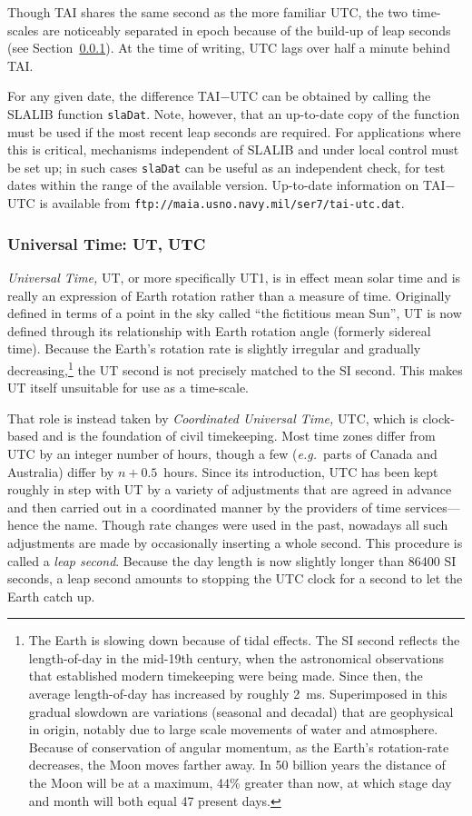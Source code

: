 \documentclass[11pt,fleqn,twoside]{article}
\renewcommand{\_}{{\tt\char'137}}     %
\begin{document}
Though TAI shares the same second as the more familiar UTC, the
two time-scales are noticeably separated in epoch because of the
build-up of leap seconds (see Section~\ref{UTC}).
At the time of writing, UTC
lags over half a minute behind TAI.
 
For any given date, the difference TAI$-$UTC
can be obtained by calling the SLALIB function
{\tt slaDat}.
Note, however, that an up-to-date copy of the function must be used if
the most recent leap seconds are required.  For applications
where this is critical, mechanisms independent of SLALIB
and under local control must
be set up;  in such cases
{\tt slaDat}
can be useful as an
independent check, for test dates within the range of the
available version.  Up-to-date information on TAI$-$UTC is available
from {\tt ftp://maia.usno.navy.mil/ser7/tai-utc.dat}.
 
\subsubsection{Universal Time: UT, UTC}
\label{UTC}
{\it Universal Time,} UT, or more specifically UT1,
is in effect mean solar time and is really an expression
of Earth rotation rather than a measure of time.
Originally
defined in terms of a point in the sky called ``the fictitious
mean Sun'', UT is now defined through its relationship
with Earth rotation angle
(formerly sidereal time).
Because the Earth's rotation rate is slightly irregular and
gradually decreasing,\footnote{The Earth is slowing
down because of tidal effects.  The SI
second reflects the length-of-day in the mid-19th century, when
the astronomical observations that established modern timekeeping
were being made.  Since then,
the average length-of-day has increased by roughly 2~ms.
Superimposed in this gradual slowdown are
variations (seasonal and decadal) that are geophysical in origin,
notably due to large scale movements of water and atmosphere.
Because of
conservation of angular momentum, as the Earth's rotation-rate
decreases, the Moon moves farther away.  In 50 billion years the
distance of the Moon will be at a maximum, 44\% greater than now, at
which stage day and month will both equal 47 present days.}
the UT second is not precisely
matched to the SI second.  This makes UT itself unsuitable for
use as a time-scale.

That role is instead taken by
{\it Coordinated Universal Time,} UTC, which is clock-based and
is the foundation of civil timekeeping.
Most time zones differ from UTC by an integer number
of hours, though a few ({\it e.g.}\ parts of Canada and Australia) differ
by $n+0.5$~hours.  Since its introduction, UTC has been kept
roughly in step with UT by a variety of adjustments that are
agreed in advance and then carried out in a coordinated manner by
the providers of time services---hence the
name.  Though rate
changes were used in the past, nowadays all such adjustments
are made by occasionally inserting
a whole second.  This procedure is called
a {\it leap second}.  Because the day length is now slightly longer
than 86400 SI seconds, a leap second amounts to stopping the UTC
clock for a second to let the Earth catch up.
\end{document}
